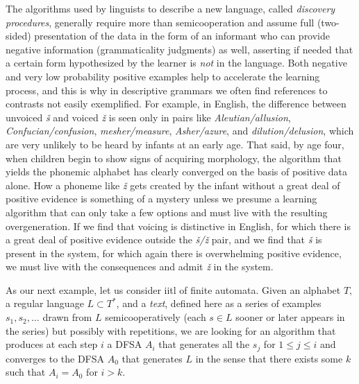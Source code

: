 The algorithms used by linguists to describe a new language, called {\it
  discovery procedures}, generally require more
than semicooperation and assume full (two-sided) presentation of the data in
the form of an informant who can provide negative information (grammaticality
judgments) as well, asserting if needed that a certain form hypothesized by
the learner is {\it not} in the language. Both negative and very low
probability positive examples help to accelerate the learning process, and
this is why in descriptive grammars we often find references to contrasts not
easily exemplified. For example, in English, the difference between unvoiced
{\it \v{s}} and voiced {\it \v{z}} is seen only in pairs like {\it
  Aleutian/allusion}, {\it Confucian/confusion}, {\it mesher/measure}, {\it
  Asher/azure}, and {\it dilution/delusion}, which are very unlikely to be
heard by infants at an early age. That said, by age four, when children begin
to show signs of acquiring morphology, the algorithm that yields the phonemic
alphabet has clearly converged on the basis of positive data alone. How a
phoneme like {\it \v{z}} gets created by the infant without a great deal of
positive evidence is something of a mystery unless we presume a learning
algorithm that can only take a few options and must live with the resulting
overgeneration. If we find that voicing is distinctive in English, for which
there is a great deal of positive evidence outside the {\it \v{s}/\v{z}} pair,
and we find that {\it \v{s}} is present in the system, for which again there
is overwhelming positive evidence, we must live with the consequences and
admit {\it \v{z}} in the system.

As our next example, let us consider iitl of finite automata. Given an
alphabet $T,$ a regular language $L\subset T^*$, and a {\it text}, defined
here as a series of examples $s_1, s_2, \ldots$ drawn from $L$
semicooperatively (each $s \in L$ sooner or later appears in the series) but
possibly with repetitions, we are looking for an algorithm that produces at
each step $i$ a DFSA $A_i$ that generates all the $s_j$ for $1 \leq j \leq i$
and converges to the DFSA $A_0$ that generates $L$ in the sense that there
exists some $k$ such that $A_i = A_0$ for $i>k$.

